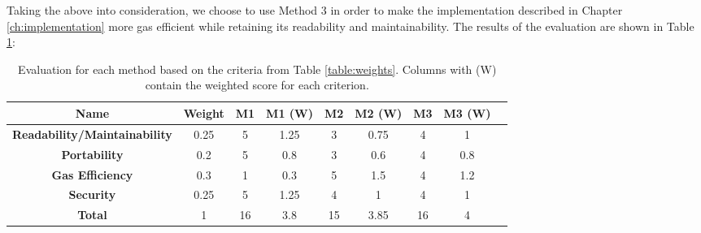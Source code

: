 Taking the above into consideration, we choose to use Method 3 in order to make the implementation described in Chapter \ref{ch:implementation} more gas efficient while retaining its readability and maintainability. The results of the evaluation are shown in Table \ref{table:evaluation}:

\begin{table}[H]
	\centering
	\vspace*{-1ex}
	\scriptsize
	\vspace{-1ex}
	\begin{tabular}{|c|c|c|c|c|c|c|c|c|}
        \hline
        \textbf{Name} & \textbf{Weight}  
      & \textbf{M1} & \textbf{M1 (W)}
      & \textbf{M2} & \textbf{M2 (W)} 
      & \textbf{M3} & \textbf{M3 (W)}\\ 
        \hline 
        \textbf{Readability/Maintainability} 
            & 0.25 & 5  & 1.25 & 3 & 0.75 & 4 & 1\\
        \textbf{Portability} 
            & 0.2  & 5  & 0.8  & 3 & 0.6  & 4 & 0.8\\
        \textbf{Gas Efficiency} 
            & 0.3  & 1  & 0.3  & 5 & 1.5  & 4 & 1.2\\
        \textbf{Security} 
            & 0.25 & 5  & 1.25 & 4 & 1    & 4 & 1\\
        \hline
        \textbf{Total} 
            & 1    & 16 & 3.8  & 15 & 3.85 & 16 & 4\\
        \hline
    \end{tabular}
	\caption{Evaluation for each method based on the criteria from Table \ref{table:weights}. Columns with (W) contain the weighted score for each criterion.}
    \label{table:evaluation}
\end{table}




